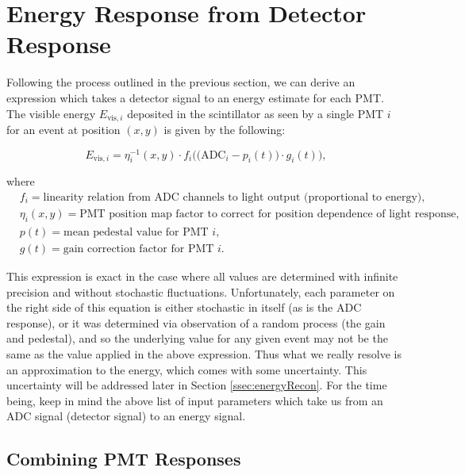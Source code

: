 
\section{Energy Response from Detector Response} \label{sec:EnergyResponse}
Following the process outlined in the previous section, we can derive an
expression which takes a detector signal to an energy estimate for each PMT.
The visible energy $E_{\mathrm{vis},i}$ deposited
in the scintillator as seen by a single PMT $i$ for an event at position $(x,y)$ 
is given by the following: 

\begin{equation} \label{eq:EvisResponse}
E_{\mathrm{vis},i} = \eta_i^{-1}(x,y) \cdot f_i\bigg( \Big( \mathrm{ADC}_i - p_i(t) \Big) \cdot g_i(t) \bigg)  ,
\end{equation}

\noindent where 
\begin{align*}
  &f_i = \text{linearity relation from ADC channels to light output (proportional to energy),}\\
  &\eta_i(x,y) = \text{PMT position map factor to correct for position dependence of light response,} \\
  &p(t) = \text{mean pedestal value for PMT } i,\\
  &g(t) = \text{gain correction factor for PMT }i.
\end{align*}

This expression is exact in the case where all values are determined with infinite
precision and without stochastic fluctuations. Unfortunately, each parameter on the right
side of this equation is either stochastic in itself (as is the ADC response), or it was
determined via observation of a random process (the gain and pedestal), and so
the underlying value for any given event may not be the same as the value applied in the
above expression. Thus what we
really resolve is an approximation to the energy, which comes with some uncertainty. This
uncertainty will be addressed later in Section \ref{ssec:energyRecon}.
For the time being, keep in mind the above list of
input parameters which take us from an ADC signal (detector signal) to an energy signal. 

\subsection{Combining PMT Responses} \label{ssec:combinePMT}

